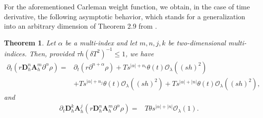 \documentclass[11pt,oneside,leqno]{amsart}
\numberwithin{equation}{section}
\numberwithin{equation}{section}
\newtheorem{theorem}{Theorem}[section]
\begin{document}
\par For the aforementioned Carleman weight function, we obtain, in the case of time derivative, the following asymptotic behavior, which stands for a generalization into an arbitrary dimension of Theorem 2.9 from \cite{CLTP-2022}.  
\begin{theorem}\label{theo:time:derivate}
Let $\alpha$ be a multi-index and let $m,n,j,k$ be two-dimensional multi-indices. Then, provided $\tau h(\delta T^{2})^{-1}\leq 1$, we have
\begin{equation}\label{eq:temporal:estimate}
    \begin{aligned}\partial_{t}\left( r \mathbf{D}_{h}^{n}\mathbf{A}_{h}^{m}\partial^{\alpha}\rho\right)=&\partial_{t}\left(r\partial^{n+\alpha}\rho \right)+Ts^{|\alpha|+n_{i}}\theta(t)\mathcal{O}_{\lambda}((sh)^{2})\\
    &+Ts^{|\alpha|+n_{j}}\theta(t)\mathcal{O}_{\lambda}((sh)^{2})+Ts^{|\alpha|+|n|}\theta(t)\mathcal{O}_{\lambda}((sh)^{2}),
    \end{aligned}
\end{equation}
and
\begin{equation}\label{eq:temporal:estimation}
\begin{split}
    \partial_{t} \mathbf{D}_{h}^{k}\mathbf{A}_{h}^{j}\left(r\mathbf{D}_{h}^{n}\mathbf{A}_{h}^{m}\partial^{\alpha}\rho\right)
    =&T\theta s^{|\alpha|+|n|}\mathcal{O}_{\lambda}(1).
    \end{split}
\end{equation}
\end{theorem}
\end{document}
